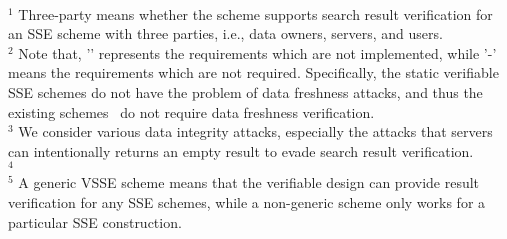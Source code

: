 \begin{table*}[t]
\begin{center}
\begin{tabular}{|c|c|c|c|c|c|c|c}
    \hline
  \end{tabular}\\
  \end{center}
  $^1$ Three-party means whether the scheme supports search result verification for an SSE scheme with three parties, i.e., data owners, servers, and users.\\
  $^2$ Note that, '\texttimes' represents the requirements which are not implemented, while '-' means the requirements which are not required. Specifically, the static verifiable SSE schemes do not have the problem of data freshness attacks, and thus the existing schemes~\cite{kurosawa2012uc,chai2012verifiable,cheng2015verifiable,ogataefficient} do not require data freshness verification.\\
  $^3$ We consider various data integrity attacks, especially the attacks that servers can intentionally returns an empty result to evade search result verification.\\
  $^4$ \\
  $^5$ A generic VSSE scheme means that the verifiable design can provide result verification for any SSE schemes, while a non-generic scheme only works for a particular SSE construction.\\
\end{table*}


